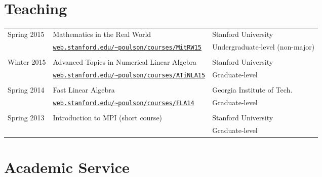 \documentclass[letterpaper]{article}
\renewenvironment{itemize}{
  \begin{list}{}{
    \setlength{\leftmargin}{1.5em}
  }
}{
  \end{list}
}
\begin{document}
\section*{Teaching}
\begin{tabular}{lll}
Spring 2015 & Mathematics in the Real World               & Stanford University \\
            & \href{http://web.stanford.edu/~poulson/courses/MitRW15}{\tt web.stanford.edu/\textasciitilde poulson/courses/MitRW15} & Undergraduate-level (non-major) \\
 & & \\
Winter 2015 & Advanced Topics in Numerical Linear Algebra & Stanford University \\
            & \href{http://web.stanford.edu/~poulson/courses/ATiNLA15}{\tt web.stanford.edu/\textasciitilde poulson/courses/ATiNLA15} & Graduate-level \\
 & & \\
Spring 2014 & Fast Linear Algebra                         & Georgia Institute of Tech.\ \\
            & \href{http://web.stanford.edu/~poulson/courses/FLA14}{\tt web.stanford.edu/\textasciitilde poulson/courses/FLA14} & Graduate-level \\
 & & \\
Spring 2013 & Introduction to MPI (short course)          & Stanford University \\
            & & Graduate-level \\
\end{tabular}


\section*{Academic Service}
\end{document}
